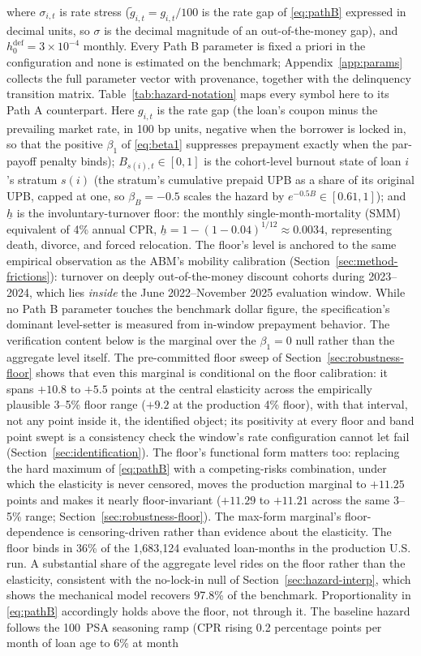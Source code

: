 \documentclass[12pt]{article}
\begin{document}
where $\sigma_{i,t}$ is rate stress ($\tilde g_{i,t} = g_{i,t}/100$ is the rate gap of \eqref{eq:pathB} expressed in decimal units, so $\sigma$ is the decimal magnitude of an out-of-the-money gap), and $h^{\mathrm{def}}_0 = 3\times10^{-4}$ monthly. Every Path B parameter is fixed a priori in the configuration and none is estimated on the benchmark; Appendix~\ref{app:params} collects the full parameter vector with provenance, together with the delinquency transition matrix. Table~\ref{tab:hazard-notation} maps every symbol here to its Path A counterpart. Here $g_{i,t}$ is the rate gap (the loan's coupon minus the prevailing market rate, in 100 bp units, negative when the borrower is locked in, so that the positive $\beta_1$ of \eqref{eq:beta1} suppresses prepayment exactly when the par-payoff penalty binds); $B_{s(i),t} \in [0,1]$ is the cohort-level burnout state of loan $i$'s stratum $s(i)$ (the stratum's cumulative prepaid UPB as a share of its original UPB, capped at one, so $\beta_B = -0.5$ scales the hazard by $e^{-0.5 B} \in [0.61, 1]$); and $\underline{h}$ is the involuntary-turnover floor: the monthly single-month-mortality (SMM) equivalent of 4\% annual CPR, $\underline{h} = 1-(1-0.04)^{1/12} \approx 0.0034$, representing death, divorce, and forced relocation. The floor's level is anchored to the same empirical observation as the ABM's mobility calibration (Section~\ref{sec:method-frictions}): turnover on deeply out-of-the-money discount cohorts during 2023--2024, which lies \emph{inside} the June 2022--November 2025 evaluation window. While no Path B parameter touches the benchmark dollar figure, the specification's dominant level-setter is measured from in-window prepayment behavior. The verification content below is the marginal over the $\beta_1 = 0$ null rather than the aggregate level itself. The pre-committed floor sweep of Section~\ref{sec:robustness-floor} shows that even this marginal is conditional on the floor calibration: it spans $+10.8$ to $+5.5$ points at the central elasticity across the empirically plausible 3--5\% floor range ($+9.2$ at the production 4\% floor), with that interval, not any point inside it, the identified object; its positivity at every floor and band point swept is a consistency check the window's rate configuration cannot let fail (Section~\ref{sec:identification}). The floor's functional form matters too: replacing the hard maximum of \eqref{eq:pathB} with a competing-risks combination, under which the elasticity is never censored, moves the production marginal to $+11.25$ points and makes it nearly floor-invariant ($+11.29$ to $+11.21$ across the same 3--5\% range; Section~\ref{sec:robustness-floor}). The max-form marginal's floor-dependence is censoring-driven rather than evidence about the elasticity. The floor binds in 36\% of the 1,683,124 evaluated loan-months in the production U.S. run. A substantial share of the aggregate level rides on the floor rather than the elasticity, consistent with the no-lock-in null of Section~\ref{sec:hazard-interp}, which shows the mechanical model recovers 97.8\% of the benchmark. Proportionality in \eqref{eq:pathB} accordingly holds above the floor, not through it. The baseline hazard follows the 100~PSA seasoning ramp (CPR rising 0.2 percentage points per month of loan age to 6\% at month 
\end{document}
